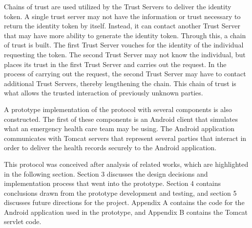 Chains of trust are used utilized by the Trust Servers to deliver the identity token. A single trust server may not have the information or trust necessary to return the identity token by itself. Instead, it can contact another Trust Server that may have more ability to generate the identity token. Through this, a chain of trust is built. The first Trust Server vouches for the identity of the individual requesting the token. The second Trust Server may not know the individual, but places its trust in the first Trust Server and carries out the request. In the process of carrying out the request, the second Trust Server may have to contact additional Trust Servers, thereby lengthening the chain. This chain of trust is what allows the trusted interaction of previously unknown parties.

A prototype implementation of the protocol with several components is also constructed. The first of these components is an Android client that simulates what an emergency health care team may be using. The Android application communicates with Tomcat servers that represent several parties that interact in order to deliver the health records securely to the Android application.

This protocol was conceived after analysis of related works, which are highlighted in the following section. Section 3 discusses the design decisions and implementation process that went into the prototype. Section 4 contains conclusions drawn from the prototype development and testing, and section 5 discusses future directions for the project. Appendix A contains the code for the Android application used in the prototype, and Appendix B contains the Tomcat servlet code.